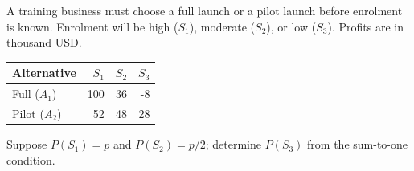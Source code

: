 \clearpage
{}
A training business must choose a full launch or a pilot launch before enrolment is known. Enrolment will be high ($S_1$), moderate ($S_2$), or low ($S_3$). Profits are in thousand USD.
\begin{center}\small\setlength{\tabcolsep}{4pt}
\begin{tabular}{@{}lrrr@{}}\toprule
Alternative&$S_1$&$S_2$&$S_3$\\\midrule
Full ($A_1$)&100&36&-8\\
Pilot ($A_2$)&52&48&28\\\bottomrule
\end{tabular}\end{center}
Suppose $P(S_1)=p$ and $P(S_2)=p/2$; determine $P(S_3)$ from the sum-to-one condition.
